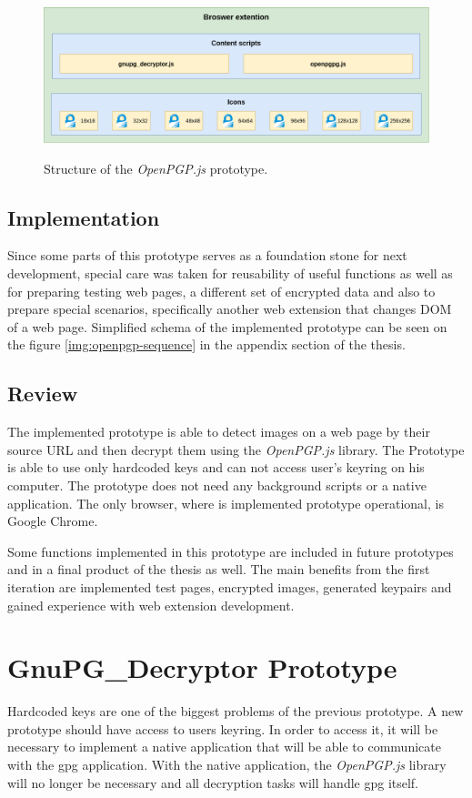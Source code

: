 \begin{figure}[H]
    \begin{center}
        \label{img:openpgpAnatomy}
        \includegraphics[width=1.0\textwidth]{obrazky-figures/prototype-openpgpjs.png}
        \caption{Structure of the \textit{OpenPGP.js} prototype.}
    \end{center}
\end{figure}

\subsection{Implementation}
Since some parts of this prototype serves as a foundation stone for next development, special care was taken for reusability of useful functions as well as for preparing testing web pages, a different set of encrypted data and also to prepare special scenarios, specifically another web extension that changes DOM of a web page. Simplified schema of the implemented prototype can be seen on the figure \ref{img:openpgp-sequence} in the appendix section of the thesis.

\subsection{Review}
The implemented prototype is able to detect images on a web page by their source URL and then decrypt them using the \textit{OpenPGP.js} library. The Prototype is able to use only hardcoded keys and can not access user's keyring on his computer. The prototype does not need any background scripts or a native application. The only browser, where is implemented prototype operational, is Google Chrome.

Some functions implemented in this prototype are included in future prototypes and in a final product of the thesis as well. The main benefits from the first iteration are implemented test pages, encrypted images, generated keypairs and gained experience with web extension development.

\section{GnuPG\_Decryptor Prototype}
\label{prototype:GnuPG_Decryptor}
Hardcoded keys are one of the biggest problems of the previous prototype. A new prototype should have access to users keyring. In order to access it, it will be necessary to implement a native application that will be able to communicate with the gpg application. With the native application, the \textit{OpenPGP.js} library will no longer be necessary and all decryption tasks will handle gpg itself.

